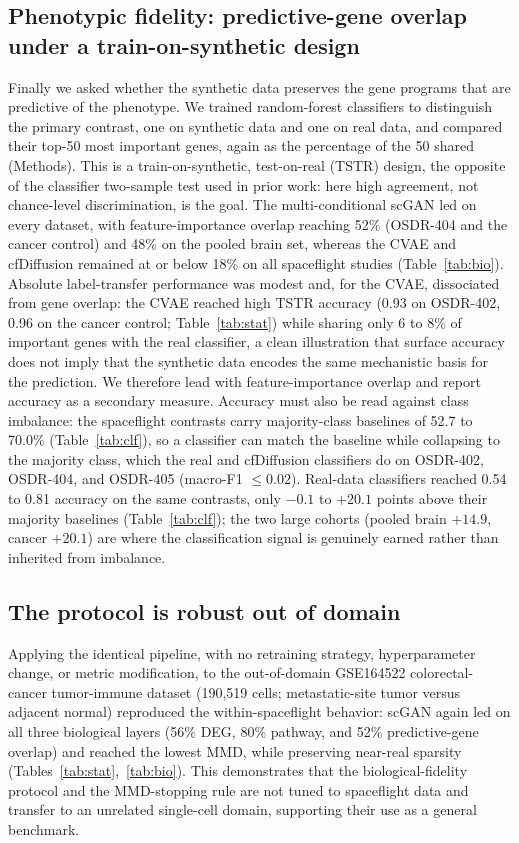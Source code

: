 \documentclass[11pt]{article}
\newcommand{\protname}{biological-fidelity protocol}
\begin{document}
\subsection{Phenotypic fidelity: predictive-gene overlap under a train-on-synthetic design}
Finally we asked whether the synthetic data preserves the gene programs that are predictive of the phenotype. We trained random-forest classifiers to distinguish the primary contrast, one on synthetic data and one on real data, and compared their top-50 most important genes, again as the percentage of the 50 shared (Methods). This is a train-on-synthetic, test-on-real (TSTR) design, the opposite of the classifier two-sample test used in prior work: here high agreement, not chance-level discrimination, is the goal. The multi-conditional scGAN led on every dataset, with feature-importance overlap reaching 52\% (OSDR-404 and the cancer control) and 48\% on the pooled brain set, whereas the CVAE and cfDiffusion remained at or below 18\% on all spaceflight studies (Table~\ref{tab:bio}). Absolute label-transfer performance was modest and, for the CVAE, dissociated from gene overlap: the CVAE reached high TSTR accuracy (0.93 on OSDR-402, 0.96 on the cancer control; Table~\ref{tab:stat}) while sharing only 6 to 8\% of important genes with the real classifier, a clean illustration that surface accuracy does not imply that the synthetic data encodes the same mechanistic basis for the prediction. We therefore lead with feature-importance overlap and report accuracy as a secondary measure. Accuracy must also be read against class imbalance: the spaceflight contrasts carry majority-class baselines of 52.7 to 70.0\% (Table~\ref{tab:clf}), so a classifier can match the baseline while collapsing to the majority class, which the real and cfDiffusion classifiers do on OSDR-402, OSDR-404, and OSDR-405 (macro-F1 $\le 0.02$). Real-data classifiers reached 0.54 to 0.81 accuracy on the same contrasts, only $-0.1$ to $+20.1$ points above their majority baselines (Table~\ref{tab:clf}); the two large cohorts (pooled brain $+14.9$, cancer $+20.1$) are where the classification signal is genuinely earned rather than inherited from imbalance.

\subsection{The protocol is robust out of domain}
Applying the identical pipeline, with no retraining strategy, hyperparameter change, or metric modification, to the out-of-domain GSE164522 colorectal-cancer tumor-immune dataset (190{,}519 cells; metastatic-site tumor versus adjacent normal) reproduced the within-spaceflight behavior: scGAN again led on all three biological layers (56\% DEG, 80\% pathway, and 52\% predictive-gene overlap) and reached the lowest MMD, while preserving near-real sparsity (Tables~\ref{tab:stat},~\ref{tab:bio}). This demonstrates that the \protname{} and the MMD-stopping rule are not tuned to spaceflight data and transfer to an unrelated single-cell domain, supporting their use as a general benchmark.
\end{document}
